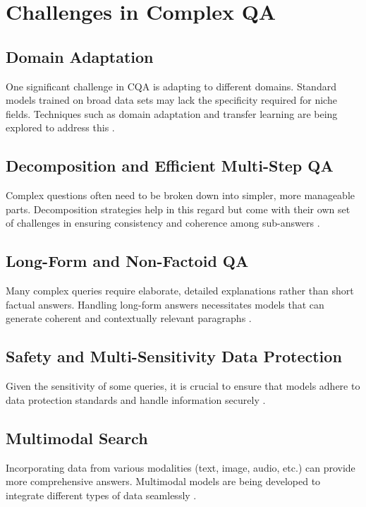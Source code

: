 \documentclass{article}
\begin{document}
\section{Challenges in Complex QA}
\label{sec:challenges}

\subsection{Domain Adaptation}
One significant challenge in CQA is adapting to different domains. Standard models trained on broad data sets may lack the specificity required for niche fields. Techniques such as domain adaptation and transfer learning are being explored to address this \cite{gururangan2020don}.

\subsection{Decomposition and Efficient Multi-Step QA}
Complex questions often need to be broken down into simpler, more manageable parts. Decomposition strategies help in this regard but come with their own set of challenges in ensuring consistency and coherence among sub-answers \cite{min2021metaicl}.

\subsection{Long-Form and Non-Factoid QA}
Many complex queries require elaborate, detailed explanations rather than short factual answers. Handling long-form answers necessitates models that can generate coherent and contextually relevant paragraphs \cite{fan2019eli5}.

\subsection{Safety and Multi-Sensitivity Data Protection}
Given the sensitivity of some queries, it is crucial to ensure that models adhere to data protection standards and handle information securely \cite{sandven2021coping}.

\subsection{Multimodal Search}
Incorporating data from various modalities (text, image, audio, etc.) can provide more comprehensive answers. Multimodal models are being developed to integrate different types of data seamlessly \cite{alayrac2022flamingo}.
\end{document}
